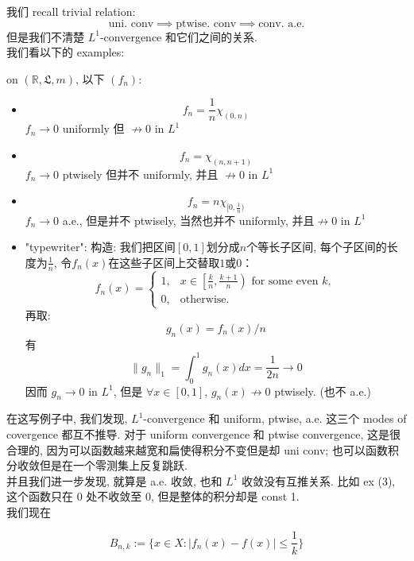 \documentclass[lang=cn,11pt]{elegantbook}
\begin{document}
我们 recall trivial relation: \[
\text{uni. conv} \implies \text{ptwise. conv} \implies \text{conv. a.e.}
\]
但是我们不清楚 $L^1$-convergence 和它们之间的关系.\\
我们看以下的 examples: 
\begin{example}
    on $(\mathbb{R}, \mathfrak{L}, m)$, 以下 $(f_n)$:
    \begin{itemize}
        \item $$f_n = \frac{1}{n} \chi_{(0,n)}$$
        $f_n \rightarrow 0$ uniformly 但 $\not\rightarrow 0$ in $L^1$

        \item $$f_n = \chi_{(n,n+1)}$$
        $f_n \rightarrow 0$ ptwisely 但并不 uniformly, 并且 $\not\rightarrow 0$ in $L^1$

        \item $$f_n = n \chi_{[0,\frac{1}{n})}$$
        $f_n \rightarrow 0$ a.e., 但是并不 ptwisely, 当然也并不 uniformly, 并且$\not\rightarrow 0$ in $L^1$
        
        \item "typewriter": 
构造: 我们把区间$[0,1]$划分成$n$个等长子区间, 每个子区间的长度为$\frac{1}{n}$, 令$f_n(x)$在这些子区间上交替取$1$或$0$：    
\[
   f_n(x) = 
   \begin{cases}
   1, & x \in \left[ \frac{k}{n}, \frac{k+1}{n} \right) \text{ for some even } k, \\
   0, & \text{otherwise}.
   \end{cases}
   \]
再取: \[
   g_n(x) = f_n(x) / n
   \]
有  \[
   \| g_n \|_1 = \int_0^1 g_n(x) dx = \frac{1}{2n} \to 0
   \] 因而 $g_n \rightarrow 0$ in $L^1$, 但是 $\forall x\in[0,1]$, $g_n(x)\not\rightarrow 0$ ptwisely. (也不 a.e.)
    \end{itemize}
\end{example}
在这写例子中, 我们发现, $L^1$-convergence 和 uniform, ptwise, a.e. 这三个 modes of covergence 都互不推导. 对于 uniform convergence 和 ptwise convergence, 这是很合理的, 因为可以函数越来越宽和扁使得积分不变但是却 uni conv; 也可以函数积分收敛但是在一个零测集上反复跳跃.\\

并且我们进一步发现, 就算是 a.e. 收敛, 也和 $L^1$ 收敛没有互推关系. 比如 ex (3), 这个函数只在 $0$ 处不收敛至 0, 但是整体的积分却是 const 1. \\

我们现在






\[B_{n,k} := \{  x\in X  :  | f_n(x) -f(x)| \leq \frac{1}{k}   \}\]
\end{document}
